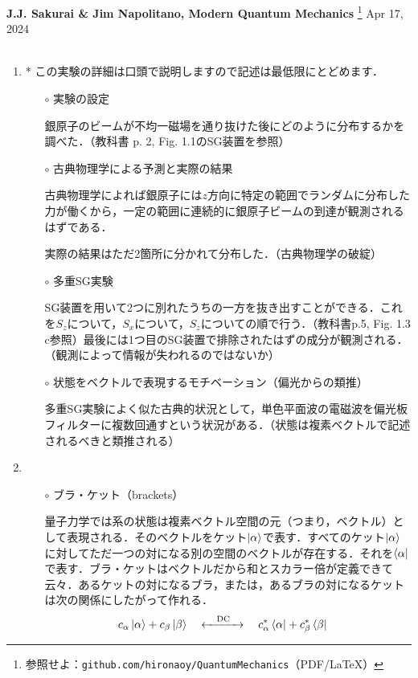 \documentclass{jarticle}
\begin{document}
\noindent
\textbf{J.J. Sakurai \& Jim Napolitano, Modern Quantum Mechanics}
\footnote{
  参照せよ：\texttt{github.com/hironaoy/QuantumMechanics}（PDF/\LaTeX）
}
\hfill Apr 17, 2024\vspace{-2mm} \\
\hrulefill \\
\begin{enumerate}
\item {} 
  
  * この実験の詳細は口頭で説明しますので記述は最低限にとどめます．
  \begin{itemize}
  \item [$\circ$] 実験の設定

    銀原子のビームが不均一磁場を通り抜けた後にどのように分布するかを調べた．（教科書 p. 2, Fig. 1.1のSG装置を参照）

  \item [$\circ$] 古典物理学による予測と実際の結果

    古典物理学によれば銀原子には$z$方向に特定の範囲でランダムに分布した力が働くから，一定の範囲に連続的に銀原子ビームの到達が観測されるはずである．
    
    実際の結果はただ2箇所に分かれて分布した．（古典物理学の破綻）

  \item [$\circ$] 多重SG実験

    SG装置を用いて2つに別れたうちの一方を抜き出すことができる．これを$S_z$について，$S_x$について，$S_z$についての順で行う．（教科書p.5, Fig. 1.3 c参照）最後には1つ目のSG装置で排除されたはずの成分が観測される．（観測によって情報が失われるのではないか）

  \item [$\circ$] 状態をベクトルで表現するモチベーション（偏光からの類推）

    多重SG実験によく似た古典的状況として，単色平面波の電磁波を偏光板フィルターに複数回通すという状況がある．（状態は複素ベクトルで記述されるべきと類推される）    
  \end{itemize}

\item {}
  \begin{itemize}
  \item [$\circ$] ブラ・ケット（brackets）
    
    量子力学では系の状態は複素ベクトル空間の元（つまり，ベクトル）として表現される．そのベクトルをケット$\ket{\alpha}$で表す．すべてのケット$\ket{\alpha}$に対してただ一つの対になる別の空間のベクトルが存在する．それを$\bra{\alpha}$で表す．ブラ・ケットはベクトルだから和とスカラー倍が定義できて云々．あるケットの対になるブラ，または，あるブラの対になるケットは次の関係にしたがって作れる．
    \begin{align}
      c_\alpha \ket{\alpha} + c_\beta \ket{\beta} \quad &\xleftrightarrow{\quad\mathrm{DC}\quad}
      \quad c_\alpha^* \bra{\alpha} + c_\beta^* \bra{\beta}
    \end{align}


\end{itemize}
\end{enumerate}
\end{document}

